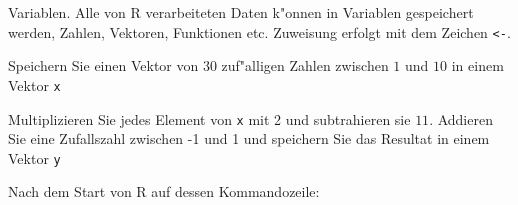 Variablen. Alle von R verarbeiteten Daten k"onnen in Variablen
gespeichert werden, Zahlen, Vektoren, Funktionen etc. Zuweisung
erfolgt mit dem Zeichen {\tt <-}.
\begin{teilaufgaben}
\item
Speichern Sie einen Vektor
von 30 zuf"alligen Zahlen zwischen $1$ und $10$ in einem Vektor
{\tt x}
\item Multiplizieren Sie jedes Element von {\tt x} mit 2 und subtrahieren
sie $11$. Addieren Sie eine Zufallszahl zwischen -1 und 1 und speichern Sie
das Resultat in einem Vektor {\tt y}
\end{teilaufgaben}

\begin{loesung}
Nach dem Start von R auf dessen Kommandozeile:
\end{loesung}

